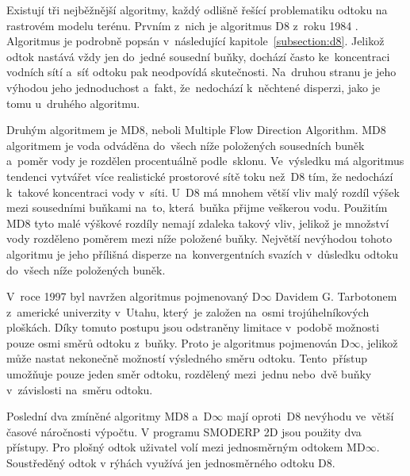 Existují tři nejběžnější algoritmy, každý odlišně řešící problematiku odtoku na rastrovém modelu terénu. Prvním z~nich je algoritmus D8 z~roku 1984 \cite{Modely1986}.
Algoritmus je podrobně popsán v~následující kapitole~\ref{subsection:d8}. Jelikož odtok nastává vždy jen do~jedné sousední buňky, dochází často ke~koncentraci vodních sítí a~síť odtoku pak neodpovídá skutečnosti.
Na~druhou stranu je jeho výhodou jeho jednoduchost a~fakt, že~nedochází k~něchtené disperzi, jako je tomu u~druhého algoritmu.

Druhým algoritmem je MD8, neboli Multiple Flow Direction Algorithm.
MD8 algoritmem je voda odváděna do~všech níže položených sousedních buněk a~poměr vody je rozdělen procentuálně podle~sklonu. Ve~výsledku má algoritmus tendenci vytvářet více realistické prostorové sítě toku než~D8 
tím, že nedochází k~takové koncentraci vody v~síti. U~D8 má mnohem větší vliv malý rozdíl výšek mezi sousedními buňkami na~to, která~buňka přijme veškerou vodu.
Použitím MD8 tyto malé výškové rozdíly nemají zdaleka takový vliv, jelikož je množství vody rozděleno poměrem mezi níže položené buňky. Největší nevýhodou tohoto algoritmu je jeho přílišná disperze na~konvergentních svazích v~důsledku odtoku do~všech níže položených buněk.

V~roce 1997 byl navržen algoritmus pojmenovaný D$\infty$ Davidem G. Tarbotonem z~americké univerzity v~Utahu, který~je založen na~osmi trojúhelníkových ploškách.%
Díky tomuto postupu jsou odstraněny limitace v~podobě možnosti pouze osmi směrů odtoku z~buňky. Proto je algoritmus pojmenován D$\infty$, jelikož může nastat nekonečně možností výsledného směru odtoku. 
Tento~přístup umožňuje pouze jeden směr odtoku, rozdělený mezi~jednu nebo~dvě buňky v~závislosti na~směru odtoku.

Poslední dva zmíněné algoritmy MD8 a~D$\infty$ mají oproti~D8 nevýhodu ve~větší časové náročnosti výpočtu. %
V programu SMODERP 2D jsou použity dva přístupy. Pro plošný odtok uživatel volí mezi jednosměrným odtokem MD$\infty$. Soustředěný odtok v rýhách využívá jen jednosměrného odtoku D8.